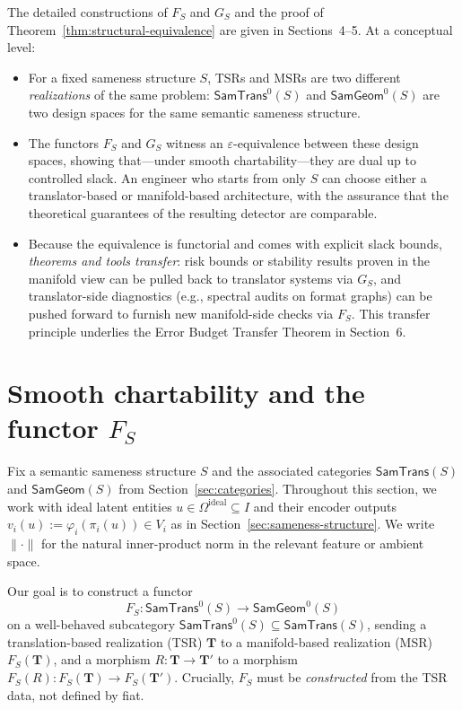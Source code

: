 \documentclass[11pt]{article}
\newcommand{\SamTrans}{\mathsf{SamTrans}}
\newcommand{\SamGeom}{\mathsf{SamGeom}}
\begin{document}
The detailed constructions of $F_S$ and $G_S$ and the proof of
Theorem~\ref{thm:structural-equivalence} are given in Sections~4--5. At a conceptual level:

\begin{itemize}
\item For a fixed sameness structure $S$, TSRs and MSRs are two different \emph{realizations} of the
same problem: $\SamTrans^0(S)$ and $\SamGeom^0(S)$ are two design spaces for the same semantic
sameness structure.

\item The functors $F_S$ and $G_S$ witness an $\varepsilon$-equivalence between these design spaces,
showing that---under smooth chartability---they are dual up to controlled slack. An engineer who
starts from only $S$ can choose either a translator-based or manifold-based architecture, with the
assurance that the theoretical guarantees of the resulting detector are comparable.

\item Because the equivalence is functorial and comes with explicit slack bounds, \emph{theorems and
tools transfer}: risk bounds or stability results proven in the manifold view can be pulled back to
translator systems via $G_S$, and translator-side diagnostics (e.g., spectral audits on format graphs)
can be pushed forward to furnish new manifold-side checks via $F_S$. This transfer principle underlies
the Error Budget Transfer Theorem in Section~6.
\end{itemize}

\section{Smooth chartability and the functor \texorpdfstring{$F_S$}{F\_S}}
\label{sec:chartability-F}

Fix a semantic sameness structure $S$ and the associated categories
$\SamTrans(S)$ and $\SamGeom(S)$ from Section~\ref{sec:categories}.
Throughout this section, we work with ideal latent entities
$u \in \Omega^{\mathrm{ideal}} \subseteq I$ and their encoder outputs
$v_i(u) := \varphi_i(\pi_i(u)) \in V_i$ as in Section~\ref{sec:sameness-structure}.
We write $\|\cdot\|$ for the natural inner-product norm in the relevant
feature or ambient space.

Our goal is to construct a functor
\[
F_S : \SamTrans^0(S) \longrightarrow \SamGeom^0(S)
\]
on a well-behaved subcategory $\SamTrans^0(S) \subseteq \SamTrans(S)$,
sending a translation-based realization (TSR) $\mathbf{T}$ to a
manifold-based realization (MSR) $F_S(\mathbf{T})$, and a morphism
$R : \mathbf{T} \to \mathbf{T}'$ to a morphism
$F_S(R) : F_S(\mathbf{T}) \to F_S(\mathbf{T}')$.
Crucially, $F_S$ must be \emph{constructed} from the TSR data, not defined
by fiat.
\end{document}
